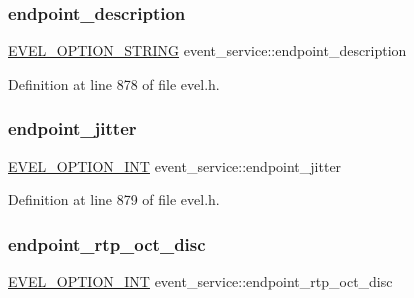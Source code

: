 \hypertarget{structevent__service_a0f06998cc84c4e53695b2f921de6116e}{}\label{structevent__service_a0f06998cc84c4e53695b2f921de6116e} 
\subsubsection{\texorpdfstring{endpoint\+\_\+description}{endpoint\_description}}
{\footnotesize\ttfamily \hyperlink{evel_8h_a0de5113a7b72de93c0c7b644f7ea7ec3}{E\+V\+E\+L\+\_\+\+O\+P\+T\+I\+O\+N\+\_\+\+S\+T\+R\+I\+NG} event\+\_\+service\+::endpoint\+\_\+description}



Definition at line 878 of file evel.\+h.

\hypertarget{structevent__service_af16ae1215238a692f0acfb5e1e955c18}{}\label{structevent__service_af16ae1215238a692f0acfb5e1e955c18} 
\subsubsection{\texorpdfstring{endpoint\+\_\+jitter}{endpoint\_jitter}}
{\footnotesize\ttfamily \hyperlink{evel_8h_a452d825778d1c2368a54b8f689a25ba7}{E\+V\+E\+L\+\_\+\+O\+P\+T\+I\+O\+N\+\_\+\+I\+NT} event\+\_\+service\+::endpoint\+\_\+jitter}



Definition at line 879 of file evel.\+h.

\hypertarget{structevent__service_a017a571b2418cd0ac44ce9c269702aca}{}\label{structevent__service_a017a571b2418cd0ac44ce9c269702aca} 
\subsubsection{\texorpdfstring{endpoint\+\_\+rtp\+\_\+oct\+\_\+disc}{endpoint\_rtp\_oct\_disc}}
{\footnotesize\ttfamily \hyperlink{evel_8h_a452d825778d1c2368a54b8f689a25ba7}{E\+V\+E\+L\+\_\+\+O\+P\+T\+I\+O\+N\+\_\+\+I\+NT} event\+\_\+service\+::endpoint\+\_\+rtp\+\_\+oct\+\_\+disc}




